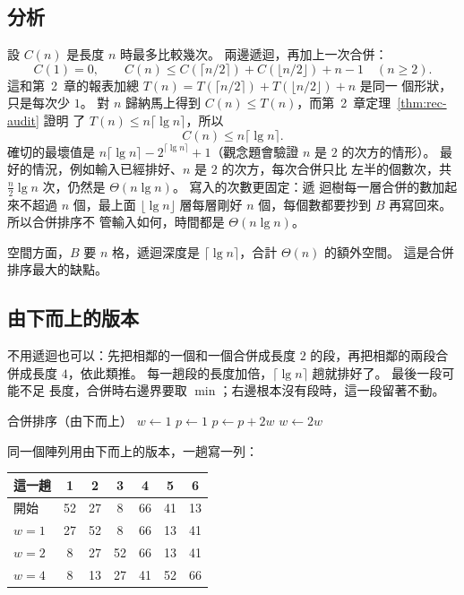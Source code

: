 \subsection{分析}

設 $C(n)$ 是長度 $n$ 時最多比較幾次。 兩邊遞迴，再加上一次合併：
\[
C(1) = 0, \qquad C(n) \le C(\lceil n/2 \rceil) + C(\lfloor n/2 \rfloor) + n - 1 \quad (n \ge 2).
\]
這和第~2~章的報表加總 $T(n) = T(\lceil n/2 \rceil) + T(\lfloor n/2 \rfloor) + n$ 是同一
個形狀，只是每次少 $1$。 對 $n$ 歸納馬上得到 $C(n) \le T(n)$，而第~2~章定理~\ref{thm:rec-audit} 證明
了 $T(n) \le n \lceil \lg n \rceil$，所以
\[
C(n) \le n \lceil \lg n \rceil .
\]
確切的最壞值是 $n \lceil \lg n \rceil - 2^{\lceil \lg n \rceil} + 1$（觀念題會驗證 $n$
是 $2$ 的次方的情形）。 最好的情況，例如輸入已經排好、$n$ 是 $2$ 的次方，每次合併只比
左半的個數次，共 $\frac{n}{2} \lg n$ 次，仍然是 $\Theta(n \lg n)$。 寫入的次數更固定：遞
迴樹每一層合併的數加起來不超過 $n$ 個，最上面 $\lfloor \lg n \rfloor$ 層每層剛好 $n$ 個，每個數都要抄到 $B$ 再寫回來。 所以合併排序不
管輸入如何，時間都是 $\Theta(n \lg n)$。

空間方面，$B$ 要 $n$ 格，遞迴深度是 $\lceil \lg n \rceil$，合計 $\Theta(n)$ 的額外空間。
這是合併排序最大的缺點。

\subsection{由下而上的版本}

不用遞迴也可以：先把相鄰的一個和一個合併成長度 $2$ 的段，再把相鄰的兩段合併成長度
$4$，依此類推。 每一趟段的長度加倍，$\lceil \lg n \rceil$ 趟就排好了。 最後一段可能不足
長度，合併時右邊界要取 $\min$；右邊根本沒有段時，這一段留著不動。

\begin{pseudo}[label=alg:so-merge-bu]{合併排序（由下而上）}
    \State $w \gets 1$ 
        \State $p \gets 1$
         
            \State {}
            \State $p \gets p + 2w$
        \EndWhile
        \State $w \gets 2w$
    \EndWhile
\EndProcedure
\end{pseudo}

同一個陣列用由下而上的版本，一趟寫一列：

\begin{center}
\begin{tabular}{l*{6}{c}}
\toprule
這一趟 & 1 & 2 & 3 & 4 & 5 & 6 \\
\midrule
開始 & 52 & 27 & 8 & 66 & 41 & 13 \\
$w = 1$ & 27 & 52 & 8 & 66 & 13 & 41 \\
$w = 2$ & 8 & 27 & 52 & 66 & 13 & 41 \\
$w = 4$ & 8 & 13 & 27 & 41 & 52 & 66 \\
\bottomrule
\end{tabular}
\end{center}

